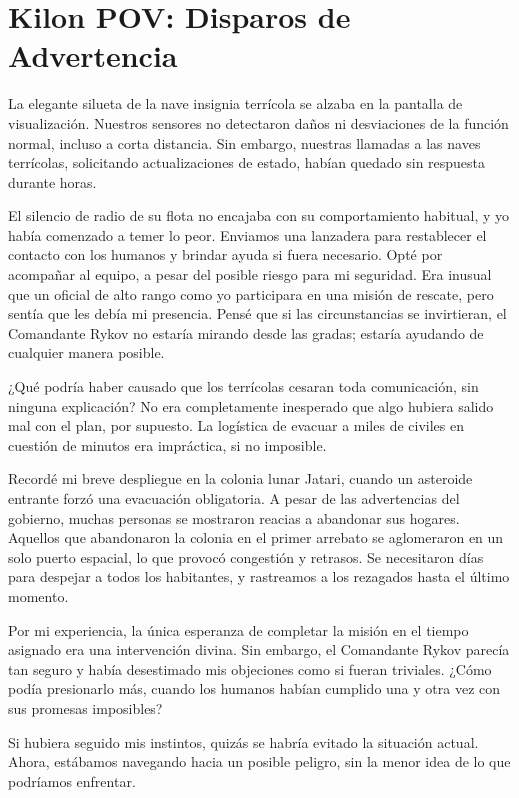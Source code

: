 \chapter{Kilon POV: Disparos de Advertencia}

La elegante silueta de la nave insignia terrícola se alzaba en la pantalla de visualización. Nuestros sensores no detectaron daños ni desviaciones de la función normal, incluso a corta distancia. Sin embargo, nuestras llamadas a las naves terrícolas, solicitando actualizaciones de estado, habían quedado sin respuesta durante horas.

El silencio de radio de su flota no encajaba con su comportamiento habitual, y yo había comenzado a temer lo peor. Enviamos una lanzadera para restablecer el contacto con los humanos y brindar ayuda si fuera necesario. Opté por acompañar al equipo, a pesar del posible riesgo para mi seguridad. Era inusual que un oficial de alto rango como yo participara en una misión de rescate, pero sentía que les debía mi presencia. Pensé que si las circunstancias se invirtieran, el Comandante Rykov no estaría mirando desde las gradas; estaría ayudando de cualquier manera posible.

¿Qué podría haber causado que los terrícolas cesaran toda comunicación, sin ninguna explicación? No era completamente inesperado que algo hubiera salido mal con el plan, por supuesto. La logística de evacuar a miles de civiles en cuestión de minutos era impráctica, si no imposible.

Recordé mi breve despliegue en la colonia lunar Jatari, cuando un asteroide entrante forzó una evacuación obligatoria. A pesar de las advertencias del gobierno, muchas personas se mostraron reacias a abandonar sus hogares. Aquellos que abandonaron la colonia en el primer arrebato se aglomeraron en un solo puerto espacial, lo que provocó congestión y retrasos. Se necesitaron días para despejar a todos los habitantes, y rastreamos a los rezagados hasta el último momento.

Por mi experiencia, la única esperanza de completar la misión en el tiempo asignado era una intervención divina. Sin embargo, el Comandante Rykov parecía tan seguro y había desestimado mis objeciones como si fueran triviales. ¿Cómo podía presionarlo más, cuando los humanos habían cumplido una y otra vez con sus promesas imposibles?

Si hubiera seguido mis instintos, quizás se habría evitado la situación actual. Ahora, estábamos navegando hacia un posible peligro, sin la menor idea de lo que podríamos enfrentar.

